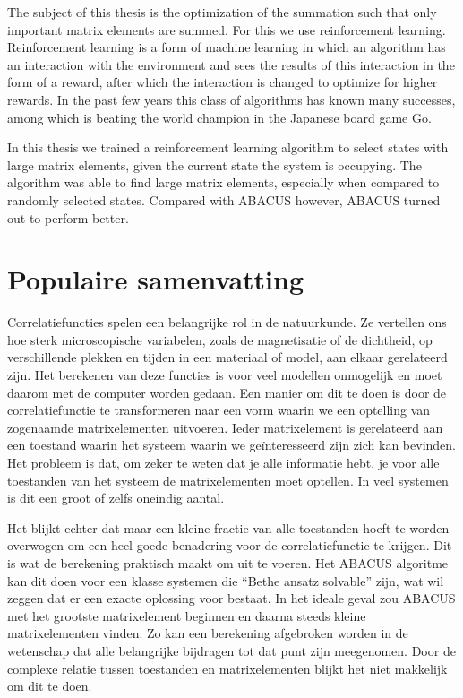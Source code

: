 \documentclass[11pt, a4paper]{report} %
\begin{document}
The subject of this thesis is the optimization of the summation such that only important matrix elements are summed.
For this we use reinforcement learning.
Reinforcement learning is a form of machine learning in which an algorithm has an interaction with the environment and sees the results of this interaction in the form of a reward, after which the interaction is changed to optimize for higher rewards.
In the past few years this class of algorithms has known many successes, among which is beating the world champion in the Japanese board game Go.

In this thesis we trained a reinforcement learning algorithm to select states with large matrix elements, given the current state the system is occupying.
The algorithm was able to find large matrix elements, especially when compared to randomly selected states.
Compared with ABACUS however, ABACUS turned out to perform better.

\section*{Populaire samenvatting}

Correlatiefuncties spelen een belangrijke rol in de natuurkunde.
Ze vertellen ons hoe sterk microscopische variabelen, zoals de magnetisatie of de dichtheid, op verschillende plekken en tijden in een materiaal of model, aan elkaar gerelateerd zijn.
Het berekenen van deze functies is voor veel modellen onmogelijk en moet daarom met de computer worden gedaan.
Een manier om dit te doen is door de correlatiefunctie te transformeren naar een vorm waarin we een optelling van zogenaamde matrixelementen uitvoeren.
Ieder matrixelement is gerelateerd aan een toestand waarin het systeem waarin we geïnteresseerd zijn zich kan bevinden.
Het probleem is dat, om zeker te weten dat je alle informatie hebt, je voor alle toestanden van het systeem de matrixelementen moet optellen.
In veel systemen is dit een groot of zelfs oneindig aantal.

Het blijkt echter dat maar een kleine fractie van alle toestanden hoeft te worden overwogen om een heel goede benadering voor de correlatiefunctie te krijgen.
Dit is wat de berekening praktisch maakt om uit te voeren.
Het ABACUS algoritme kan dit doen voor een klasse systemen die ``Bethe ansatz solvable'' zijn, wat wil zeggen dat er een exacte oplossing voor bestaat.
In het ideale geval zou ABACUS met het grootste matrixelement beginnen en daarna steeds kleine matrixelementen vinden.
Zo kan een berekening afgebroken worden in de wetenschap dat alle belangrijke bijdragen tot dat punt zijn meegenomen.
Door de complexe relatie tussen toestanden en matrixelementen blijkt het niet makkelijk om dit te doen.
\end{document}
